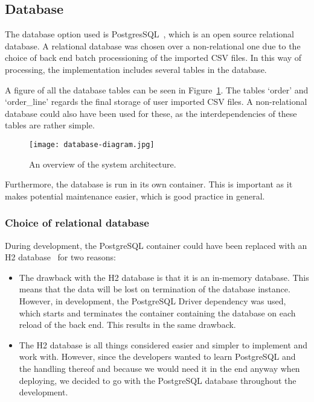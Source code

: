 \subsection{Database}\label{subsec:database}

The database option used is PostgresSQL~\cite{postgresql2024}, which is an open source relational database.
A relational database was chosen over a non-relational one due to the choice of back end batch processioning of the
imported CSV files.
In this way of processing, the implementation includes several tables in the database.

A figure of all the database tables can be seen in Figure~\ref{fig:database-diagram}.
The tables `order' and `order\_line' regards the final storage of user imported CSV files.
A non-relational database could also have been used for these, as the interdependencies of these tables are rather
simple.

\begin{figure}[H]
    \centering
    \texttt{[image: database-diagram.jpg]}
    \caption{An overview of the system architecture.
    }\label{fig:database-diagram}
\end{figure}

Furthermore, the database is run in its own container.
This is important as it makes potential maintenance easier, which is good practice in general.

\subsubsection{Choice of relational database}\label{subsubsec:choice-of-relational-database}

During development, the PostgreSQL container could have been replaced with
an H2
database~\cite{h22024} for two reasons:

\begin{itemize}
    \item The drawback with the
    H2
    database is that it is an in-memory database.
    This means that the data will be lost on termination of the database instance.
    However, in development, the PostgreSQL Driver dependency was used, which starts and terminates the container
    containing the database on each reload of the back end.
    This results in the same drawback.
    \item The
    H2
    database is all things considered easier and simpler to implement and work with.
    However, since the developers wanted to learn PostgreSQL and the handling thereof and because we would
    need it in the end anyway when deploying, we decided to go with the PostgreSQL database throughout the development.
\end{itemize}
